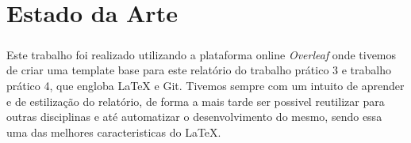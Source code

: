 \chapter*{\thechapter \quad Estado da Arte}
\paragraph{}
Este trabalho foi realizado utilizando a plataforma online \textit{Overleaf} onde tivemos de criar uma template base para este relatório do trabalho prático 3 e trabalho prático 4, que engloba LaTeX e Git. 
Tivemos sempre com um intuito de aprender e de estilização do relatório, de forma a mais tarde ser possivel reutilizar para outras disciplinas e até automatizar o desenvolvimento do mesmo, sendo essa uma das melhores caracteristicas do LaTeX.



